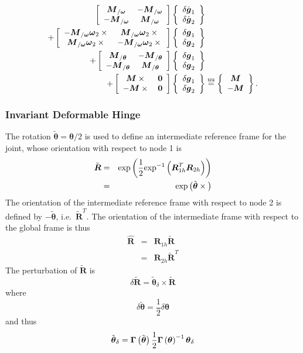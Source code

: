 \documentclass[10pt,dvips,fleqn,subeqn]{report}
\newcommand{\T}[1]{\boldsymbol{#1}}
\newcommand{\equu}{\overset{\text{uu}}{=}}
\begin{document}
\begin{align}
	\sqbr{\matr{cc}{
		\T{M}_{/\T{\omega}} & - \T{M}_{/\T{\omega}} \\
		- \T{M}_{/\T{\omega}} & \T{M}_{/\T{\omega}}
	}}\cubr{\cvvect{
		\delta\dot{\T{g}}_1 \\
		\delta\dot{\T{g}}_2
	}} & \nonumber \\
	+ \sqbr{\matr{cc}{
		- \T{M}_{/\T{\omega}} \T{\omega}_2 \times{} & \T{M}_{/\T{\omega}} \T{\omega}_2 \times{} \\
		\T{M}_{/\T{\omega}} \T{\omega}_2 \times{} & - \T{M}_{/\T{\omega}} \T{\omega}_2 \times{}
	}} \cubr{\cvvect{
		\delta\T{g}_1 \\
		\delta\T{g}_2 
	}} & \nonumber \\
	+ \sqbr{\matr{cc}{
		\T{M}_{/\T{\theta}} & - \T{M}_{/\T{\theta}} \\
		- \T{M}_{/\T{\theta}} & \T{M}_{/\T{\theta}}
	}} \cubr{\cvvect{
		\delta\T{g}_1 \\
		\delta\T{g}_2 
	}} & \nonumber \\
	+ \sqbr{\matr{cc}{
		\T{M}\times{} & \T{0} \\
		- \T{M}\times{} & \T{0}
	}} \cubr{\cvvect{
		\delta\T{g}_1 \\
		\delta\T{g}_2 
	}} &\equu \cubr{\cvvect{
		\T{M} \\
		- \T{M}
	}} .
\end{align}


\subsubsection{Invariant Deformable Hinge}
\label{sec:deformable-hinge-invariant}
The rotation $\tilde{\T{\theta}}=\T{\theta}/2$
is used to define an intermediate reference frame for the joint,
whose orientation with respect to node 1 is
\begin{eqnarray}
	\tilde{\T{R}} & = & \llk{exp}\plbr{\frac{1}{2}\llk{exp}^{-1}\plbr{\T{R}_{1h}^T \T{R}_{2h}}} \\
		& = & \llk{exp}\plbr{\tilde{\T{\theta}}\times{}}
\end{eqnarray}
The orientation of the intermediate reference frame with respect 
to node 2 is defined by $-\tilde{\T{\theta}}$, i.e.\ $\tilde{\T{R}}^T$.
The orientation of the intermediate frame with respect
to the global frame is thus
\begin{eqnarray}
	\hat{\T{R}} & = & \T{R}_{1h} \tilde{\T{R}}
		\label{eq:inv-def-h-hatR-1} \\
	& = & \T{R}_{2h} \tilde{\T{R}}^T
		\label{eq:inv-def-h-hatR-2}
\end{eqnarray}
The perturbation of $\tilde{\T{R}}$ is
\begin{equation}
	\delta\tilde{\T{R}} = \tilde{\T{\theta}}_{\delta}\times\tilde{\T{R}}
\end{equation}
where
\begin{equation}
	\delta\tilde{\T{\theta}} = \frac{1}{2} \delta \T{\theta}
\end{equation}
and thus
\begin{equation}
	\tilde{\T{\theta}}_{\delta} = \T{\Gamma}\plbr{\tilde{\T{\theta}}} \frac{1}{2} \T{\Gamma}\plbr{\T{\theta}}^{-1} \T{\theta}_{\delta} 
\end{equation}
\end{document}
